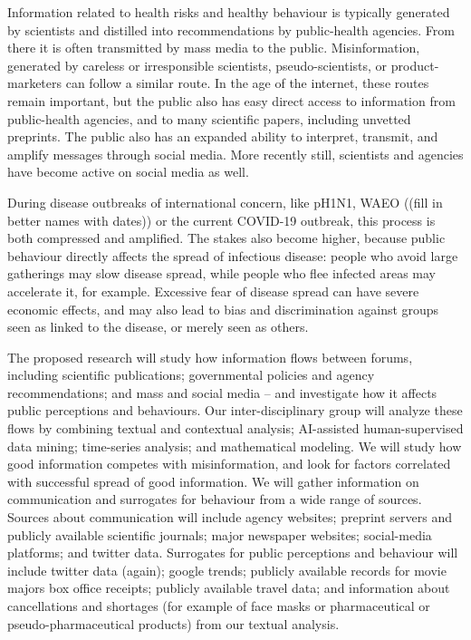 
\proptitle{\fulltitle}


Information related to health risks and healthy behaviour is typically generated by scientists and distilled into recommendations by public-health agencies. From there it is often transmitted by mass media to the public. Misinformation, generated by careless or irresponsible scientists, pseudo-scientists, or product-marketers can follow a similar route. In the age of the internet, these routes remain important, but the public also has easy direct access to information from public-health agencies, and to many scientific papers, including unvetted preprints. The public also has an expanded ability to interpret, transmit, and amplify messages through social media. More recently still, scientists and agencies have become active on social media as well.

During disease outbreaks of international concern, like pH1N1, WAEO ((fill in better names with dates)) or the current COVID-19 outbreak, this process is both compressed and amplified. The stakes also become higher, because public behaviour directly affects the spread of infectious disease: people who avoid large gatherings may slow disease spread, while people who flee infected areas may accelerate it, for example. Excessive fear of disease spread can have severe economic effects, and may also lead to bias and discrimination against groups seen as linked to the disease, or merely seen as others.

The proposed research will study how information flows between forums, including scientific publications; governmental policies and agency recommendations; and mass and social media -- and investigate how it affects public perceptions and behaviours. 
Our inter-disciplinary group will analyze these flows by combining textual and contextual analysis; AI-assisted human-supervised data mining; time-series analysis; and mathematical modeling. We will study how good information competes with misinformation, and look for factors correlated with successful spread of good information. 
We will gather information on communication and surrogates for behaviour from a wide range of sources. 
Sources about communication will include agency websites; preprint servers and publicly available scientific journals; major newspaper websites; social-media platforms; and twitter data.
Surrogates for public perceptions and behaviour will include twitter data (again); google trends; publicly available records for movie majors box office receipts; publicly available travel data; and information about cancellations and shortages (for example of face masks or pharmaceutical or pseudo-pharmaceutical products) from our textual analysis. 


